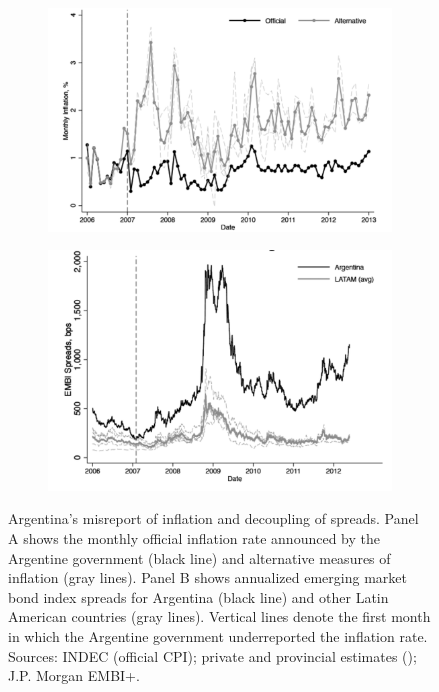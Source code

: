 \documentclass[12pt]{article}
\theoremstyle{plain}
\begin{document}
\begin{figure}[htbp]
	\centering
	\begin{subfigure}[t]{0.49\textwidth}
		\centering
		\includegraphics[width=\linewidth]{../../pro-default-model/results/inflation_arg.png}
		\label{fig:argentina_inflation}
	\end{subfigure}\hfill
	\begin{subfigure}[t]{0.49\textwidth}
		\centering
		\includegraphics[width=\linewidth]{../../pro-default-model/results/spread_arg.png}
		\label{fig:argentina_spread}
	\end{subfigure}
	\caption{Argentina’s misreport of inflation and decoupling of spreads. Panel A shows the monthly official inflation rate announced by the Argentine government (black line) and alternative measures of inflation (gray lines). Panel B shows annualized emerging market bond index spreads for Argentina (black line) and other Latin American countries (gray lines). Vertical lines denote the first month in which the Argentine government underreported the inflation rate. Sources: INDEC (official CPI); private and provincial estimates (\citep{Cavallo2013}); J.P. Morgan EMBI+.}
	\label{fig:argentina_spreads}
\end{figure}
\end{document}
